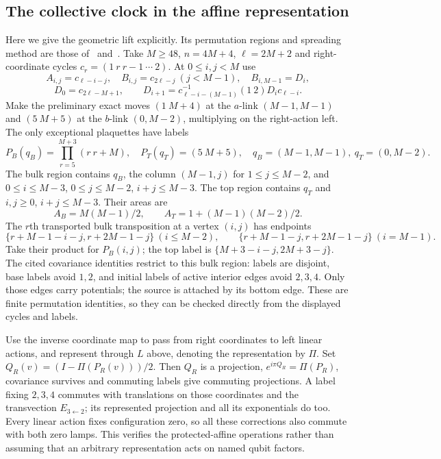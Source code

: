 \subsection{The collective clock in the affine representation}
Here we give the geometric lift explicitly. Its permutation regions and spreading method are those of~\cite[Propositions~6.1 and~6.5, Lemma~6.4]{DM-H3} and~\cite[Proposition~13.9]{DM-precision}.
Take $M\ge48$, $n=4M+4$, $\ell=2M+2$ and right-coordinate cycles $c_r=(1\ r\ r-1\ \cdots\ 2)$. At $0\le i,j<M$ use
\[
 A_{i,j}=c_{\ell-i-j},\quad B_{i,j}=c_{2\ell-j}\ (j<M-1),\quad B_{i,M-1}=D_i,
\]
\[
 D_0=c_{2\ell-M+1},\qquad D_{i+1}=c_{\ell-i-(M-1)}^{-1}(1\ 2)D_ic_{\ell-i}.
\]
Make the preliminary exact moves $(1\ M+4)$ at the $a$-link $(M-1,M-1)$ and $(5\ M+5)$ at the $b$-link $(0,M-2)$, multiplying on the right-action left. The only exceptional plaquettes have labels
\[
 P_B(q_B)=\prod_{r=5}^{M+3}(r\ r+M),\quad P_T(q_T)=(5\ M+5),\quad
 q_B=(M-1,M-1),\ q_T=(0,M-2).
\]
The bulk region contains $q_B$, the column $(M-1,j)$ for $1\le j\le M-2$, and $0\le i\le M-3$, $0\le j\le M-2$, $i+j\le M-3$.
The top region contains $q_T$ and $i,j\ge0$, $i+j\le M-3$. Their areas are
\[
 A_B=M(M-1)/2,\qquad A_T=1+(M-1)(M-2)/2.
\]
The $r$th transported bulk transposition at a vertex $(i,j)$ has endpoints
\[
 \{r+M-1-i-j,r+2M-1-j\}\ (i\le M-2),\qquad
 \{r+M-1-j,r+2M-1-j\}\ (i=M-1).
\]
Take their product for $P_B(i,j)$; the top label is $\{M+3-i-j,2M+3-j\}$. The cited covariance identities restrict to this bulk region: labels are disjoint, base labels avoid $1,2$, and initial labels of active interior edges avoid $2,3,4$. Only those edges carry potentials; the source is attached by its bottom edge. These are finite permutation identities, so they can be checked directly from the displayed cycles and labels.

Use the inverse coordinate map to pass from right coordinates to left linear actions, and represent through $L$ above, denoting the representation by $\Pi$. Set $Q_R(v)=(I-\Pi(P_R(v)))/2$. Then $Q_R$ is a projection, $e^{i\pi Q_R}=\Pi(P_R)$, covariance survives and commuting labels give commuting projections. A label fixing $2,3,4$ commutes with translations on those coordinates and the transvection $E_{3\leftarrow2}$; its represented projection and all its exponentials do too. Every linear action fixes configuration zero, so all these corrections also commute with both zero lamps. This verifies the protected-affine operations rather than assuming that an arbitrary representation acts on named qubit factors.

